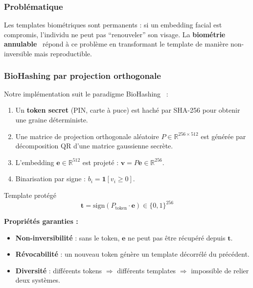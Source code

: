 \documentclass[12pt,a4paper]{article}
\begin{document}
\subsubsection{Problématique}

Les templates biométriques sont permanents : si un embedding facial est
compromis, l'individu ne peut pas ``renouveler'' son visage. La
\textbf{biométrie annulable}~\cite{ratha2001} répond à ce problème en
transformant le template de manière non-inversible mais reproductible.

\subsubsection{BioHashing par projection orthogonale}

Notre implémentation suit le paradigme BioHashing~\cite{jin2004} :

\begin{enumerate}
  \item Un \textbf{token secret} (PIN, carte à puce) est haché par SHA-256
        pour obtenir une graine déterministe.
  \item Une matrice de projection orthogonale aléatoire $P \in \mathbb{R}^{256
        \times 512}$ est générée par décomposition QR d'une matrice gaussienne
        secrète.
  \item L'embedding $\mathbf{e} \in \mathbb{R}^{512}$ est projeté :
        $\mathbf{v} = P\mathbf{e} \in \mathbb{R}^{256}$.
  \item Binarisation par signe : $b_i = \mathbf{1}[v_i \geq 0]$.
\end{enumerate}

\begin{formulebox}{Template protégé}
\[
  \mathbf{t} = \text{sign}(P_{\text{token}} \cdot \mathbf{e}) \in \{0,1\}^{256}
\]
\end{formulebox}

\textbf{Propriétés garanties :}
\begin{itemize}
  \item \textbf{Non-inversibilité} : sans le token, $\mathbf{e}$ ne peut pas
        être récupéré depuis $\mathbf{t}$.
  \item \textbf{Révocabilité} : un nouveau token génère un template
        décorrélé du précédent.
  \item \textbf{Diversité} : différents tokens $\Rightarrow$ différents templates
        $\Rightarrow$ impossible de relier deux systèmes.
\end{itemize}
\end{document}
